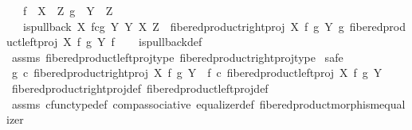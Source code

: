 \begin{isabellebody}
\ \ \ {\isachardoublequoteopen}f\ {\isacharcolon}{\kern0pt}\ X\ {\isasymrightarrow}\ Z{\isachardoublequoteclose}\ {\isachardoublequoteopen}g\ {\isacharcolon}{\kern0pt}\ Y\ {\isasymrightarrow}\ Z{\isachardoublequoteclose}\isanewline
\ \ \ {\isachardoublequoteopen}is{\isacharunderscore}{\kern0pt}pullback\ {\isacharparenleft}{\kern0pt}X\ \isactrlbsub f\isactrlesub {\isasymtimes}\isactrlsub c\isactrlbsub g\isactrlesub \ Y{\isacharparenright}{\kern0pt}\ Y\ X\ Z\ \ {\isacharparenleft}{\kern0pt}fibered{\isacharunderscore}{\kern0pt}product{\isacharunderscore}{\kern0pt}right{\isacharunderscore}{\kern0pt}proj\ X\ f\ g\ Y{\isacharparenright}{\kern0pt}\ g\ {\isacharparenleft}{\kern0pt}fibered{\isacharunderscore}{\kern0pt}product{\isacharunderscore}{\kern0pt}left{\isacharunderscore}{\kern0pt}proj\ X\ f\ g\ Y{\isacharparenright}{\kern0pt}\ f{\isachardoublequoteclose}\isanewline
%
\isadelimproof
\ \ %
\endisadelimproof
%
\isatagproof
{}\isamarkupfalse%
\ is{\isacharunderscore}{\kern0pt}pullback{\isacharunderscore}{\kern0pt}def\isanewline
\ \ \isamarkupfalse%
\ assms\ fibered{\isacharunderscore}{\kern0pt}product{\isacharunderscore}{\kern0pt}left{\isacharunderscore}{\kern0pt}proj{\isacharunderscore}{\kern0pt}type\ fibered{\isacharunderscore}{\kern0pt}product{\isacharunderscore}{\kern0pt}right{\isacharunderscore}{\kern0pt}proj{\isacharunderscore}{\kern0pt}type\isanewline
{}\isamarkupfalse%
\ safe\isanewline
\ \ \isamarkupfalse%
\ {\isachardoublequoteopen}g\ {\isasymcirc}\isactrlsub c\ fibered{\isacharunderscore}{\kern0pt}product{\isacharunderscore}{\kern0pt}right{\isacharunderscore}{\kern0pt}proj\ X\ f\ g\ Y\ {\isacharequal}{\kern0pt}\ f\ {\isasymcirc}\isactrlsub c\ fibered{\isacharunderscore}{\kern0pt}product{\isacharunderscore}{\kern0pt}left{\isacharunderscore}{\kern0pt}proj\ X\ f\ g\ Y{\isachardoublequoteclose}\isanewline
\ \ \ \ \isamarkupfalse%
\ fibered{\isacharunderscore}{\kern0pt}product{\isacharunderscore}{\kern0pt}right{\isacharunderscore}{\kern0pt}proj{\isacharunderscore}{\kern0pt}def\ fibered{\isacharunderscore}{\kern0pt}product{\isacharunderscore}{\kern0pt}left{\isacharunderscore}{\kern0pt}proj{\isacharunderscore}{\kern0pt}def\isanewline
\ \ \ \ \isamarkupfalse%
\ assms\ cfunc{\isacharunderscore}{\kern0pt}type{\isacharunderscore}{\kern0pt}def\ comp{\isacharunderscore}{\kern0pt}associative{}\ equalizer{\isacharunderscore}{\kern0pt}def\ fibered{\isacharunderscore}{\kern0pt}product{\isacharunderscore}{\kern0pt}morphism{\isacharunderscore}{\kern0pt}equalizer\isanewline

\end{isabellebody}
